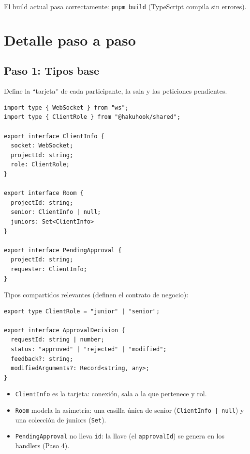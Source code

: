\documentclass[11pt,a4paper]{article}
\begin{document}
El build actual pasa correctamente: \texttt{pnpm build} (TypeScript compila sin errores).

\section{Detalle paso a paso}

\subsection{Paso 1: Tipos base}

Define la ``tarjeta'' de cada participante, la sala y las peticiones pendientes.

\begin{lstlisting}[caption=packages/gateway-hub/src/types.ts]
import type { WebSocket } from "ws";
import type { ClientRole } from "@hakuhook/shared";

export interface ClientInfo {
  socket: WebSocket;
  projectId: string;
  role: ClientRole;
}

export interface Room {
  projectId: string;
  senior: ClientInfo | null;
  juniors: Set<ClientInfo>
}

export interface PendingApproval {
  projectId: string;
  requester: ClientInfo;
}
\end{lstlisting}

Tipos compartidos relevantes (definen el contrato de negocio):

\begin{lstlisting}[caption=packages/shared/src/types.ts (extracto)]
export type ClientRole = "junior" | "senior";

export interface ApprovalDecision {
  requestId: string | number;
  status: "approved" | "rejected" | "modified";
  feedback?: string;
  modifiedArguments?: Record<string, any>;
}
\end{lstlisting}

\begin{itemize}
  \item \texttt{ClientInfo} es la tarjeta: conexión, sala a la que pertenece y rol.
  \item \texttt{Room} modela la asimetría: una casilla única de senior
        (\texttt{ClientInfo | null}) y una colección de juniors (\texttt{Set}).
  \item \texttt{PendingApproval} no lleva \texttt{id}: la llave (el
        \texttt{approvalId}) se genera en los handlers (Paso 4).
\end{itemize}
\end{document}
